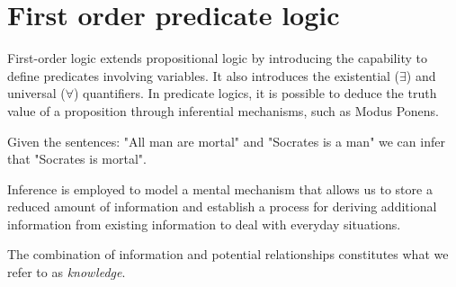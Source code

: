 \section{First order predicate logic}

First-order logic extends propositional logic by introducing the capability to define predicates involving variables. 
It also introduces the existential ($\exists$) and universal ($\forall$) quantifiers.
In predicate logics, it is possible to deduce the truth value of a proposition through inferential mechanisms, such as Modus Ponens.
\begin{example}
    Given the sentences: "All man are mortal" and "Socrates is a man" we can infer that "Socrates is mortal".
\end{example}
Inference is employed to model a mental mechanism that allows us to store a reduced amount of information and establish a process for deriving additional information from existing information to deal with everyday situations.
\begin{definition}
    The combination of information and potential relationships constitutes what we refer to as \emph{knowledge}.
\end{definition}